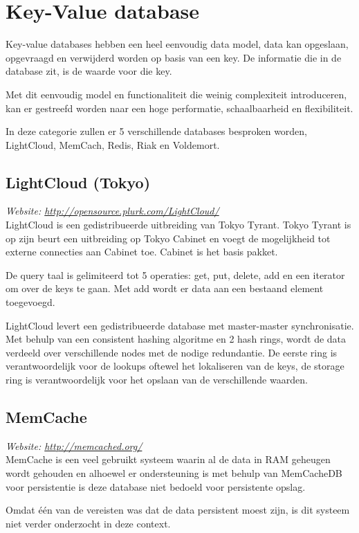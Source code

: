 \section{Key-Value database}
Key-value databases hebben een heel eenvoudig data model, data kan opgeslaan, opgevraagd en verwijderd worden op basis van een key. De informatie die in de database zit, is de waarde voor die key. 

Met dit eenvoudig model en functionaliteit die weinig complexiteit introduceren, kan er gestreefd worden naar een hoge performatie, schaalbaarheid en flexibiliteit. 

In deze categorie zullen er 5 verschillende databases besproken worden, LightCloud, MemCach, Redis, Riak en Voldemort. 

\subsection{LightCloud (Tokyo)}
\textit{Website: \url{http://opensource.plurk.com/LightCloud/}}\\
LightCloud is een gedistribueerde uitbreiding van Tokyo Tyrant. Tokyo Tyrant is op zijn beurt een uitbreiding op Tokyo Cabinet en voegt de mogelijkheid tot externe connecties aan Cabinet toe. Cabinet is het basis pakket. 

De query taal is gelimiteerd tot 5 operaties: get, put, delete, add en een iterator om over de keys te gaan. Met add wordt er data aan een bestaand element toegevoegd. 

LightCloud levert een gedistribueerde database met master-master synchronisatie. Met behulp van een consistent hashing algoritme en 2 hash rings, wordt de data verdeeld over verschillende nodes met de nodige redundantie. De eerste ring is verantwoordelijk voor de lookups oftewel het lokaliseren van de keys, de storage ring is verantwoordelijk voor het opslaan van de verschillende waarden. 

\subsection{MemCache}
\textit{Website: \url{http://memcached.org/}}\\
MemCache is een veel gebruikt systeem waarin al de data in RAM geheugen wordt gehouden en alhoewel er ondersteuning is met behulp van MemCacheDB voor persistentie is deze database niet bedoeld voor persistente opslag. 

Omdat één van de vereisten was dat de data persistent moest zijn, is dit systeem niet verder onderzocht in deze context. 

